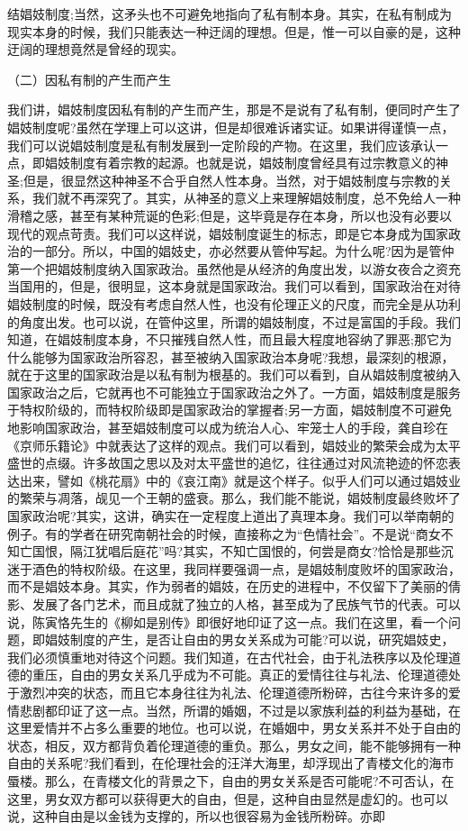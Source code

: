 \documentclass[
    a4paper
    ]{article}
\begin{document}
结娼妓制度;当然，这矛头也不可避免地指向了私有制本身。其实，在私有制成为现实本身的时候，我们只能表达一种迂阔的理想。但是，惟一可以自豪的是，这种迂阔的理想竟然是曾经的现实。

（二）因私有制的产生而产生

我们讲，娼妓制度因私有制的产生而产生，那是不是说有了私有制，便同时产生了娼妓制度呢?虽然在学理上可以这讲，但是却很难诉诸实证。如果讲得谨慎一点，我们可以说娼妓制度是私有制发展到一定阶段的产物。在这里，我们应该承认一点，即娼妓制度有着宗教的起源。也就是说，娼妓制度曾经具有过宗教意义的神圣;但是，很显然这种神圣不合乎自然人性本身。当然，对于娼妓制度与宗教的关系，我们就不再深究了。其实，从神圣的意义上来理解娼妓制度，总不免给人一种滑稽之感，甚至有某种荒诞的色彩;但是，这毕竟是存在本身，所以也没有必要以现代的观点苛责。我们可以这样说，娼妓制度诞生的标志，即是它本身成为国家政治的一部分。所以，中国的娼妓史，亦必然要从管仲写起。为什么呢?因为是管仲第一个把娼妓制度纳入国家政治。虽然他是从经济的角度出发，以游女夜合之资充当国用的，但是，很明显，这本身就是国家政治。我们可以看到，国家政治在对待娼妓制度的时候，既没有考虑自然人性，也没有伦理正义的尺度，而完全是从功利的角度出发。也可以说，在管仲这里，所谓的娼妓制度，不过是富国的手段。我们知道，在娼妓制度本身，不只摧残自然人性，而且最大程度地容纳了罪恶;那它为什么能够为国家政治所容忍，甚至被纳入国家政治本身呢?我想，最深刻的根源，就在于这里的国家政治是以私有制为根基的。我们可以看到，自从娼妓制度被纳入国家政治之后，它就再也不可能独立于国家政治之外了。一方面，娼妓制度是服务于特权阶级的，而特权阶级即是国家政治的掌握者;另一方面，娼妓制度不可避免地影响国家政治，甚至娼妓制度可以成为统治人心、牢笼士人的手段，龚自珍在《京师乐籍论》中就表达了这样的观点。我们可以看到，娼妓业的繁荣会成为太平盛世的点缀。许多故国之思以及对太平盛世的追忆，往往通过对风流艳迹的怀恋表达出来，譬如《桃花扇》中的《哀江南》就是这个样子。似乎人们可以通过娼妓业的繁荣与凋落，觇见一个王朝的盛衰。那么，我们能不能说，娼妓制度最终败坏了国家政治呢?其实，这讲，确实在一定程度上道出了真理本身。我们可以举南朝的例子。有的学者在研究南朝社会的时候，直接称之为“色情社会”。不是说“商女不知亡国恨，隔江犹唱后庭花”吗?其实，不知亡国恨的，何尝是商女?恰恰是那些沉迷于酒色的特权阶级。在这里，我同样要强调一点，是娼妓制度败坏的国家政治，而不是娼妓本身。其实，作为弱者的娼妓，在历史的进程中，不仅留下了美丽的倩影、发展了各门艺术，而且成就了独立的人格，甚至成为了民族气节的代表。可以说，陈寅恪先生的《柳如是别传》即很好地印证了这一点。我们在这里，看一个问题，即娼妓制度的产生，是否让自由的男女关系成为可能?可以说，研究娼妓史，我们必须慎重地对待这个问题。我们知道，在古代社会，由于礼法秩序以及伦理道德的重压，自由的男女关系几乎成为不可能。真正的爱情往往与礼法、伦理道德处于激烈冲突的状态，而且它本身往往为礼法、伦理道德所粉碎，古往今来许多的爱情悲剧都印证了这一点。当然，所谓的婚姻，不过是以家族利益的利益为基础，在这里爱情并不占多么重要的地位。也可以说，在婚姻中，男女关系并不处于自由的状态，相反，双方都背负着伦理道德的重负。那么，男女之间，能不能够拥有一种自由的关系呢?我们看到，在伦理社会的汪洋大海里，却浮现出了青楼文化的海市蜃楼。那么，在青楼文化的背景之下，自由的男女关系是否可能呢?不可否认，在这里，男女双方都可以获得更大的自由，但是，这种自由显然是虚幻的。也可以说，这种自由是以金钱为支撑的，所以也很容易为金钱所粉碎。亦即
\end{document}
